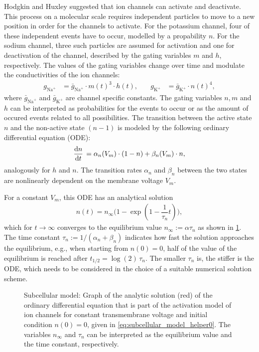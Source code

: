 Hodgkin and Huxley suggested that ion channels can activate and deactivate. This process on a molecular scale requires independent  particles to move to a new position in order for the channels to activate. For the potassium channel, four of these independent events have to occur, modelled by a propability $n$. For the sodium channel, three such particles are assumed for activation and one for deactivation of the channel, described by the gating variables $m$ and $h$, respectively. The values of the gating variables change over time and modulate the conductivities of the ion channels:
%
\begin{align*}
  g_{\text{Na}^{+}} &= \bar{g}_{\text{Na}^{+}} \cdot m(t)^3 \cdot h(t), \quad &g_{\text{K}^{+}} &= \bar{g}_{\text{K}^{+}} \cdot n(t)^4,
\end{align*}
%
where $\bar{g}_{\text{Na}^{+}}$ and $\bar{g}_{\text{K}^{+}}$ are channel specific constants. The gating variables $n,m$ and $h$ can be interpreted as probabilities for the events to occur or as the amount of occured events related to all possibilities. The transition between the active state $n$ and the non-active state $(n-1)$ is modeled by the following ordinary differential equation (ODE):%
\begin{align*}
  \d{n}{t} = \alpha_n(V_m) \cdot (1-n) + \beta_n(V_m) \cdot n,
\end{align*}
analogously for $h$ and $n$. The transition rates $\alpha_n$ and $\beta_n$ between the two states are nonlinearly dependent on the membrane voltage $V_m$.

For a constant $V_m$, this ODE has an analytical solution
\begin{align}\label{eq:subcellular_model_helper0}
  n(t) = n_\infty\big(1 - \exp(1 - \dfrac{1}{\tau_n}t)\big),
\end{align}
which for $t\to \infty$ converges to the equilibrium value $n_\infty := \alpha\tau_n$ as shown in \cref{fig:ode_solution}. The time constant $\tau_n := 1/(\alpha_n + \beta_n)$ indicates how fast the solution approaches the equilibrium, e.g., when starting from $n(0)=0$, half of the value of the equilibrium is reached after $t_{1/2}=\log(2)\,\tau_n$. The smaller $\tau_n$ is, the stiffer is the ODE, which needs to be considered in the choice of a suitable numerical solution scheme.

\begin{figure}%
  \centering%
  \def\svgwidth{0.4\textwidth}
  \caption{Subcellular model: Graph of the analytic solution (red) of the ordinary differential equation that is part of the activation model of ion channels for constant transmembrane voltage and initial condition $n(0)=0$, given in \cref{eq:subcellular_model_helper0}. The variables $n_\infty$ and $\tau_n$ can be interpreted as the equilibrium value and the time constant, respectively.}%
  \label{fig:ode_solution}%
\end{figure}

